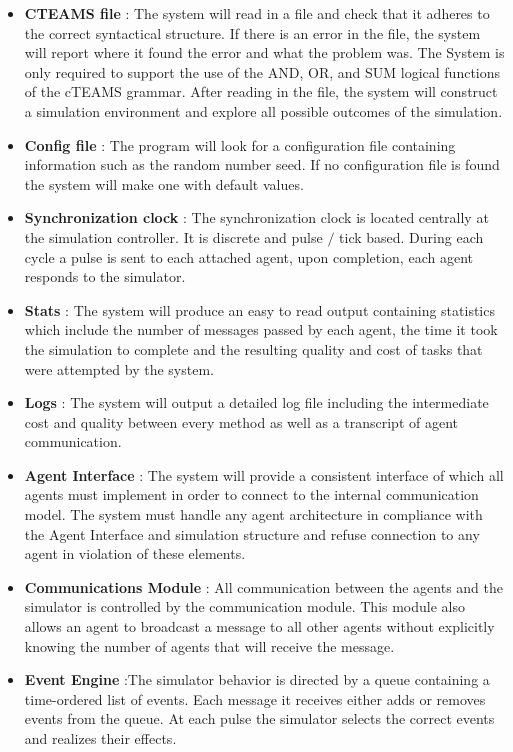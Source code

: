 \documentclass{article}
\begin{document}
\begin{itemize}
\item{\textbf{CTEAMS file} : The system will read in a file and check that it adheres to the correct syntactical structure. If there is an error in the file, the system will report where it found the error and what the problem was. The System is only required to support the use of the AND, OR, and SUM logical functions of the cTEAMS grammar. After reading in the file, the system will construct a simulation environment and explore all possible outcomes of the simulation.}

\item{\textbf{Config file} : The program will look for a configuration file containing information such as the random number seed. If no configuration file is found the system will make one with default values.}

\item{\textbf{Synchronization clock} : The synchronization clock is located centrally at the simulation controller. It is discrete and pulse ${/}$ tick based. During each cycle a pulse is sent to each attached agent, upon completion, each agent responds to the simulator.}

\item{\textbf{Stats} : The system will produce an easy to read output containing statistics which include the number of messages passed by each agent, the time it took the simulation to complete and the resulting quality and cost of tasks that were attempted by the system.}

\item{\textbf{Logs} : The system will output a detailed log file including the intermediate cost and quality between every method as well as a transcript of agent communication.}

\item{\textbf{Agent Interface} : The system will provide a consistent interface of which all agents must implement in order to connect to the internal communication model. The system must handle any agent architecture in compliance with the Agent Interface and simulation structure and refuse connection to any agent in violation of these elements.}

\item{\textbf{Communications Module} : All communication between the agents and the simulator is controlled by the communication module.  This module also allows an agent to broadcast a message to all other agents without explicitly knowing the number of agents that will receive the message.}

\item{\textbf{Event Engine} :The simulator behavior is directed by a queue containing a time-ordered list of events. Each message it receives either adds or removes events from the queue. At each pulse the simulator selects the correct events and realizes their effects.}

\end{itemize}
\end{document}
